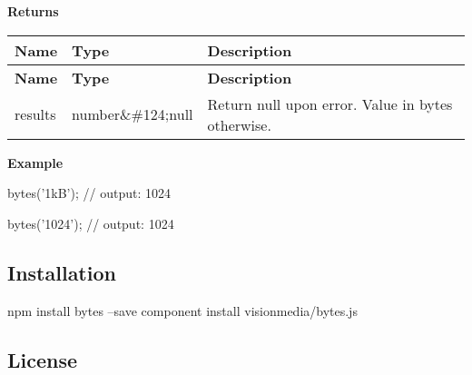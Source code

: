 {\bfseries Returns}

\tabulinesep=1mm
\begin{longtabu} spread 0pt [c]{*{3}{|X[-1]}|}
\hline
\rowcolor{\tableheadbgcolor}\textbf{ Name  }&\textbf{ Type  }&\textbf{ Description   }\\
\endfirsthead
\hline
\endfoot
\hline
\rowcolor{\tableheadbgcolor}\textbf{ Name  }&\textbf{ Type  }&\textbf{ Description   }\\
\endhead
results  &{\ttfamily number}\&\#124;{\ttfamily null}  &Return null upon error. Value in bytes otherwise.   \\
\end{longtabu}


{\bfseries Example}


\begin{DoxyCode}
bytes('1kB');
// output: 1024

bytes('1024');
// output: 1024
\end{DoxyCode}


\subsection*{Installation}


\begin{DoxyCode}
npm install bytes --save
component install visionmedia/bytes.js
\end{DoxyCode}


\subsection*{License}

\href{https://github.com/visionmedia/bytes.js/blob/master/LICENSE}{\tt } 